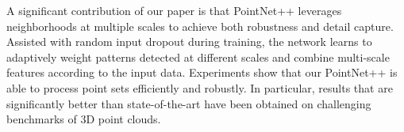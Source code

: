 A significant contribution of our paper is that PointNet++ leverages neighborhoods at multiple scales to achieve both robustness and detail capture. Assisted with random input dropout during training, the network learns to adaptively weight patterns detected at different scales and combine multi-scale features according to the input data. Experiments show that our PointNet++ is able to process point sets efficiently and robustly. In particular, results that are significantly better than state-of-the-art have been obtained on challenging benchmarks of 3D point clouds.

















